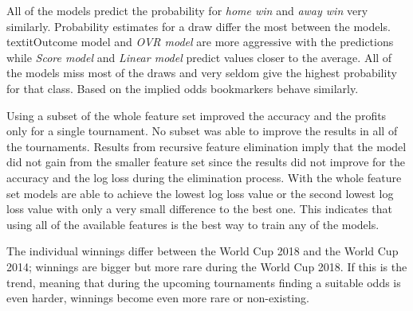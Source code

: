 All of the models predict the probability for \textit{home win} and \textit{away win} very similarly. Probability estimates for a draw differ the most between the models. textit{Outcome model} and \textit{OVR model} are more aggressive with the predictions while \textit{Score model} and \textit{Linear model} predict values closer to the average. All of the models miss most of the draws and very seldom give the highest probability for that class. Based on the implied odds bookmarkers behave similarly.

Using a subset of the whole feature set improved the accuracy and the profits only for a single tournament. No subset was able to improve the results in all of the tournaments. Results from recursive feature elimination imply that the model did not gain from the smaller feature set since the results did not improve for the accuracy and the log loss during the elimination process. With the whole feature set models are able to achieve the lowest log loss value or the second lowest log loss value with only a very small difference to the best one. This indicates that using all of the available features is the best way to train any of the models.

The individual winnings differ between the World Cup 2018 and the World Cup 2014; winnings are bigger but more rare during the World Cup 2018. If this is the trend, meaning that during the upcoming tournaments finding a suitable odds is even harder, winnings become even more rare or non-existing.


